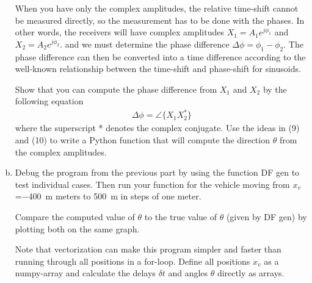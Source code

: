 \begin{enumerate}[a)]
	When you have only the complex amplitudes, the relative time-shift cannot be measured directly, so the measurement has to be done with the phases. In other words, the receivers will have complex amplitudes $X_1 = A_1 e^{j\phi_1}$ and $X_2 = A_2 e^{j\phi_2}$. 
	and we must determine the phase difference $\Delta \phi = \phi_1 - \phi_2$.
	The phase difference can then be converted into a time difference according to the well-known relationship between the time-shift and phase-shift for sinusoids.
	
	Show that you can compute the phase difference from $X_1$ and $X_2$ by the following equation
	\begin{align*}
		\Delta \phi = \angle \{ X_1 X_2^* \}
	\end{align*}
	where the superscript * denotes the complex conjugate. Use the ideas in (9) and (10) to write a Python 	function that will compute the direction $\theta$ from the complex amplitudes.
		
	\item Debug the program from the previous part by using the function DF gen to test individual
	cases. Then run your function for the vehicle moving from $x_v$=\qty{-400}{m} meters to \qty{+500}{m} in steps of one meter.
	
	Compare the computed value of $\theta$ to the true value of $\theta$ (given by DF gen) by plotting both on the same graph.
	
	Note that vectorization can make this program simpler and faster than running through all positions in a for-loop. Define all positions $x_v$ as a numpy-array and calculate the delays $\delta t$ and angles $\theta$ directly as arrays. 
	
\end{enumerate}







